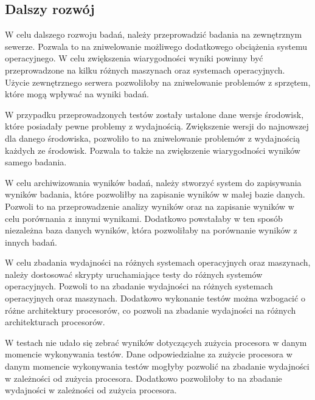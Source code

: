 \subsection{Dalszy rozwój}
W celu dalszego rozwoju badań, należy przeprowadzić badania na zewnętrznym sewerze. Pozwala to na zniwelowanie możliwego dodatkowego obciążenia systemu operacyjnego. W celu zwiększenia wiarygodności wyniki powinny być przeprowadzone na kilku różnych maszynach oraz systemach operacyjnych. Użycie zewnętrznego serwera pozwoliłoby na zniwelowanie problemów z sprzętem, które mogą wpływać na wyniki badań.

W przypadku przeprowadzonych testów zostały ustalone dane wersje środowisk, które posiadały pewne problemy z wydajnością. Zwiększenie wersji do najnowszej dla danego środowiska, pozwoliło to na zniwelowanie problemów z wydajnością każdych ze środowisk. Pozwala to także na zwiększenie wiarygodności wyników samego badania.

W celu archiwizowania wyników badań, należy stworzyć system do zapisywania wyników badania, które pozwoliłby na zapisanie wyników w małej bazie danych. Pozwoli to na przeprowadzenie analizy wyników oraz na zapisanie wyników w celu porównania z innymi wynikami. Dodatkowo powstałaby w ten sposób niezależna baza danych wyników, która pozwoliłaby na porównanie wyników z innych badań.

W celu zbadania wydajności na różnych systemach operacyjnych oraz maszynach, należy dostosować skrypty uruchamiające testy do różnych systemów operacyjnych. Pozwoli to na zbadanie wydajności na różnych systemach operacyjnych oraz maszynach. Dodatkowo wykonanie testów można wzbogacić o różne architektury procesorów, co pozwoli na zbadanie wydajności na różnych architekturach procesorów.

W testach nie udało się zebrać wyników dotyczących zużycia procesora w danym momencie wykonywania testów. Dane odpowiedzialne za zużycie procesora w danym momencie wykonywania testów mogłyby pozwolić na zbadanie wydajności w zależności od zużycia procesora. Dodatkowo pozwoliłoby to na zbadanie wydajności w zależności od zużycia procesora.
